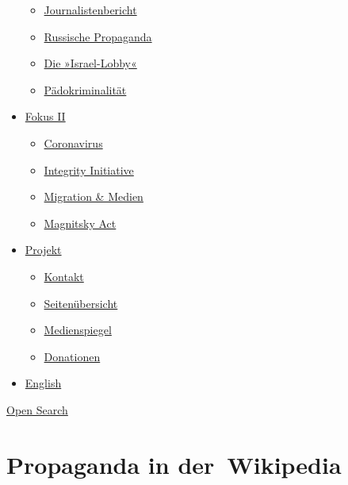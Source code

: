 \begin{itemize}
  \begin{itemize}
  \tightlist
  \item
    \href{https://swprs.org/bericht-eines-journalisten/}{Journalistenbericht}
  \item
    \href{https://swprs.org/russische-propaganda/}{Russische Propaganda}
  \item
    \href{https://swprs.org/die-israel-lobby-fakten-und-mythen/}{Die
    »Israel-Lobby«}
  \item
    \href{https://swprs.org/geopolitik-und-paedokriminalitaet/}{Pädokriminalität}
  \end{itemize}
\item
  \href{https://swprs.org/migration-und-medien/}{Fokus II}

  \begin{itemize}
  \tightlist
  \item
    \href{https://swprs.org/covid-19-hinweis-ii/}{Coronavirus}
  \item
    \href{https://swprs.org/die-integrity-initiative/}{Integrity
    Initiative}
  \item
    \href{https://swprs.org/migration-und-medien/}{Migration \& Medien}
  \item
    \href{https://swprs.org/der-fall-magnitsky/}{Magnitsky Act}
  \end{itemize}
\item
  \href{https://swprs.org/kontakt/}{Projekt}

  \begin{itemize}
  \tightlist
  \item
    \href{https://swprs.org/kontakt/}{Kontakt}
  \item
    \href{https://swprs.org/uebersicht/}{Seitenübersicht}
  \item
    \href{https://swprs.org/medienspiegel/}{Medienspiegel}
  \item
    \href{https://swprs.org/donationen/}{Donationen}
  \end{itemize}
\item
  \href{https://swprs.org/contact/}{English}
\end{itemize}

\protect\hyperlink{}{Open Search}

\hypertarget{propaganda-in-der-wikipedia}{%
\section{Propaganda in
der~Wikipedia}\label{propaganda-in-der-wikipedia}}

